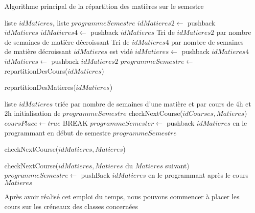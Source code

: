 \documentclass[12pt,a4paper,french]{article}
\begin{document}
\begin{algorithm}
\caption{Algorithme principal de la répartition des matières sur le semestre}
\begin{algorithmic}
\REQUIRE liste $idMatieres$, liste $programmeSemestre$
\STATE $idMatieres2 \leftarrow$ pushback $idMatieres$
\ELSE
\STATE $idMatieres4 \leftarrow$ pushback $idMatieres$
\ENDIF
\ENDFOR
\STATE Tri de $idMatieres2$ par nombre de semaines de matière décroissant
\STATE Tri de $idMatieres4$ par nombre de semaines de matière décroissant
\STATE $idMatieres$ est vidé
\STATE $idMatieres \leftarrow$ pushback $idMatieres4$
\ENDFOR
{}
\STATE $idMatieres \leftarrow$ pushback $idMatieres2$
\ENDFOR
\RETURN $programmeSemestre \leftarrow$ repartitionDesCours($idMatieres$)
\end{algorithmic}
\end{algorithm}

\begin{algorithm}
\caption{repartitionDesMatieres($idMatieres$)}
\begin {algorithmic}
\REQUIRE liste $idMatieres$ triée par nombre de semaines d'une matière et par cours de 4h et 2h
\STATE initialisation de $programmeSemestre$
\STATE checkNextCourse($idCourses, Matieres$)
\STATE $coursPlace \leftarrow true$
\STATE BREAK
\ENDIF
\ENDIF
\ENDFOR
{}
\STATE $programmeSemester \leftarrow$ pushback $idMatieres$ en le programmant en début de semestre
\ENDIF
\ENDFOR
\RETURN $programmeSemestre$
\end{algorithmic}
\end{algorithm}


\newpage

\begin{algorithm}
\caption{checkNextCourse($idMatieres, Matieres$)}
\begin {algorithmic}
\STATE checkNextCourse($idMatieres, Matieres$ du $Matieres$ suivant)
\STATE $programmeSemestre \leftarrow$ pushBack $idMatieres$ en le programmant après le cours $Matieres$
\ENDIF
\end{algorithmic}
\end{algorithm}

Après avoir réalisé cet emploi du temps, nous pouvons commencer à placer les cours sur les créneaux des classes concernées



\end{document}
